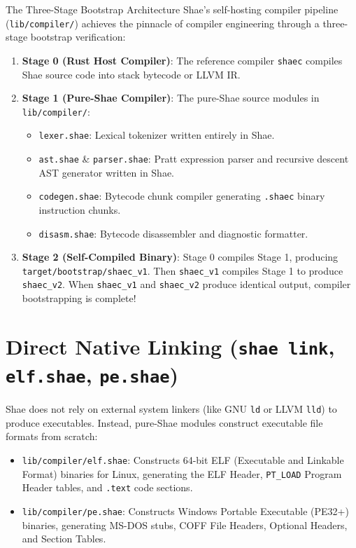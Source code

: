 \begin{deepbox}{The Three-Stage Bootstrap Architecture}
Shae's self-hosting compiler pipeline (\texttt{lib/compiler/}) achieves the pinnacle of compiler engineering through a three-stage bootstrap verification:
\begin{enumerate}
    \item \textbf{Stage 0 (Rust Host Compiler)}: The reference compiler \texttt{shaec} compiles Shae source code into stack bytecode or LLVM IR.
    \item \textbf{Stage 1 (Pure-Shae Compiler)}: The pure-Shae source modules in \texttt{lib/compiler/}:
    \begin{itemize}
        \item \texttt{lexer.shae}: Lexical tokenizer written entirely in Shae.
        \item \texttt{ast.shae} \& \texttt{parser.shae}: Pratt expression parser and recursive descent AST generator written in Shae.
        \item \texttt{codegen.shae}: Bytecode chunk compiler generating \texttt{.shaec} binary instruction chunks.
        \item \texttt{disasm.shae}: Bytecode disassembler and diagnostic formatter.
    \end{itemize}
    \item \textbf{Stage 2 (Self-Compiled Binary)}: Stage 0 compiles Stage 1, producing \texttt{target/bootstrap/shaec\_v1}. Then \texttt{shaec\_v1} compiles Stage 1 to produce \texttt{shaec\_v2}. When \texttt{shaec\_v1} and \texttt{shaec\_v2} produce identical output, compiler bootstrapping is complete!
\end{enumerate}
\end{deepbox}

\section{Direct Native Linking (\texttt{shae link}, \texttt{elf.shae}, \texttt{pe.shae})}

Shae does not rely on external system linkers (like GNU \texttt{ld} or LLVM \texttt{lld}) to produce executables. Instead, pure-Shae modules construct executable file formats from scratch:
\begin{itemize}
    \item \texttt{lib/compiler/elf.shae}: Constructs 64-bit ELF (Executable and Linkable Format) binaries for Linux, generating the ELF Header, \texttt{PT\_LOAD} Program Header tables, and \texttt{.text} code sections.
    \item \texttt{lib/compiler/pe.shae}: Constructs Windows Portable Executable (PE32+) binaries, generating MS-DOS stubs, COFF File Headers, Optional Headers, and Section Tables.
\end{itemize}
